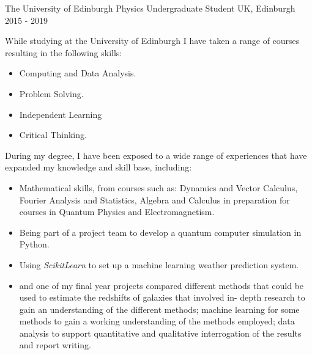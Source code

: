 
\cventry
{The University of Edinburgh} %
{Physics Undergraduate Student} %
{UK, Edinburgh} %
{2015 - 2019} %
{
    While studying at the University of Edinburgh I have taken a range of 
    courses resulting in the following skills: 
    \begin{itemize}
        \item Computing and Data Analysis.
        \item Problem Solving.
        \item Independent Learning
        \item Critical Thinking.
    \end{itemize}
    During my degree, I have been exposed to a wide range of experiences that 
    have expanded my knowledge and skill base, including:
    \begin{itemize}
        \item Mathematical skills, from courses such as: Dynamics and Vector 
            Calculus, Fourier Analysis and Statistics, Algebra and Calculus 
            in preparation for courses in Quantum Physics and Electromagnetism.
        \item Being part of a project team to develop a quantum computer 
            simulation in Python.
        \item Using \textit{ScikitLearn} to set up a machine learning weather 
            prediction system.
        \item and one of my final year projects compared different methods 
    that could be used to estimate the redshifts of galaxies that involved in-
    depth research to gain an understanding of the different methods; machine 
    learning for some methods to gain a working understanding of the methods 
    employed; data analysis to support quantitative and qualitative 
    interrogation of the results and report writing.\newline \end{itemize}
}
